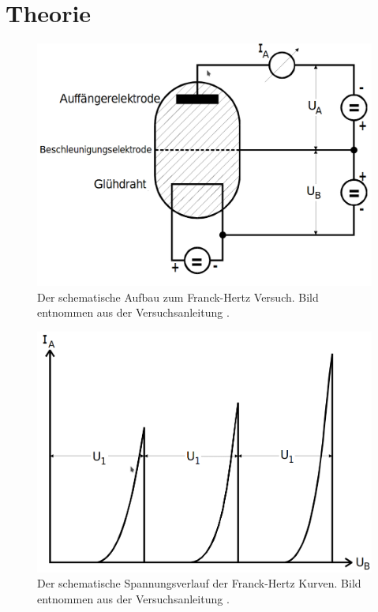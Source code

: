 \section{Theorie}
\label{sec:Theorie}

\begin{figure}
    \centering
    \includegraphics[width=\textwidth]{content/data/schematischeraufbau.png}
    \caption{Der schematische Aufbau zum Franck-Hertz Versuch. Bild entnommen aus der Versuchsanleitung \cite[2]{anleitung}.}
    \label{fig:schematischeraufbau}
\end{figure}

\begin{figure}
    \centering
    \includegraphics[width=\textwidth]{content/data/Spannungsverlauf.png}
    \caption{Der schematische Spannungsverlauf der Franck-Hertz Kurven. Bild entnommen aus der Versuchsanleitung \cite[4]{anleitung}.}
    \label{fig:spannungsverlauf}
\end{figure}

